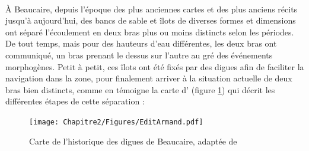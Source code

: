         \paragraph{} À Beaucaire, depuis l'époque des plus anciennes cartes et des plus anciens récits jusqu'à aujourd'hui, des bancs de sable et îlots de diverses formes et dimensions ont séparé l'écoulement en deux bras plus ou moins distincts selon les périodes. De tout temps, mais pour des hauteurs d'eau différentes, les deux bras ont communiqué, un bras prenant le dessus sur l'autre au gré des événements morphogènes. Petit à petit, ces îlots ont été fixés par des digues afin de faciliter la navigation dans la zone, pour finalement arriver à la situation actuelle de deux bras bien distincts, comme en témoigne la carte d'\citet{armand_ii_1907} (figure \ref{fig:DigArmand}) qui décrit les différentes étapes de cette séparation :
        
         \begin{figure}[h]
            \centering
            \texttt{[image: Chapitre2/Figures/EditArmand.pdf]}
            \caption{Carte de l'historique des digues de Beaucaire, adaptée de \citet{armand_ii_1907}}
            \label{fig:DigArmand}
        \end{figure}
        
